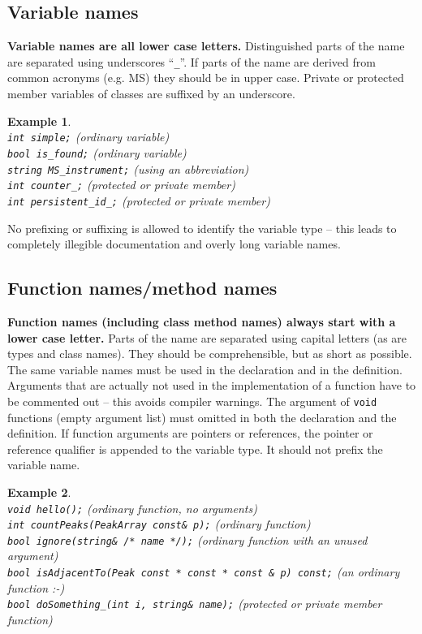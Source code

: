 \documentclass[a4]{article}
\newtheorem{example}{Example}
\begin{document}
\subsection{Variable names}

\textbf{Variable names are all lower case letters.}  Distinguished parts of
the name are separated using underscores ``{\tt \_}''. If parts of the name
are derived from common acronyms (e.g. MS) they should be in upper case.
Private or protected member variables of classes are suffixed by an
underscore.
\begin{example}~\\
  {\tt int simple;} (ordinary variable)\\
  {\tt bool is\_found;} (ordinary variable)\\
  {\tt string MS\_instrument;} (using an abbreviation)\\
  {\tt int counter\_;} (protected or private member)\\
  {\tt int persistent\_id\_;} (protected or private member)
\end{example}
No prefixing or suffixing is allowed to identify the variable type -- this
leads to completely illegible documentation and overly long variable names.


\subsection{Function names/method names}

\textbf{Function names (including class method names) always start with a
  lower case letter.}  Parts of the name are separated using capital letters
(as are types and class names).  They should be comprehensible, but as short
as possible.  The same variable names must be used in the declaration and in
the definition.  Arguments that are actually not used in the implementation of
a function have to be commented out -- this avoids compiler warnings.  The
argument of \texttt{void} functions (empty argument list) must omitted in both
the declaration and the definition.  If function arguments are pointers or
references, the pointer or reference qualifier is appended to the variable
type. It should not prefix the variable name.
\begin{example}~\\
{\tt void hello();} (ordinary function, no arguments) \\
{\tt int countPeaks(PeakArray const\& p);} (ordinary function) \\
{\tt bool ignore(string\& /* name */);} (ordinary function with an unused argument) \\
{\tt bool isAdjacentTo(Peak const * const * const \& p) const;} (an ordinary function :-) \\
{\tt bool doSomething\_(int i, string\& name);} (protected or private member function)
\end{example}
\end{document}
